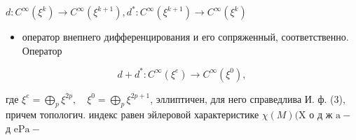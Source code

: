 \documentclass[10pt]{article}
\begin{document}
$d: C^{\infty}\left(\xi^{k}\right) \rightarrow C^{\infty}\left(\xi^{k+1}\right), d^{*}: C^{\infty}\left(\xi^{k+1}\right) \rightarrow C^{\infty}\left(\xi^{k}\right)$



\begin{itemize}

  \item оператор внепнего дифференцирования и его сопряженный, соответственно. Оператор

\end{itemize}



\[

d+d^{*}: C^{\infty}\left(\xi^{e}\right) \rightarrow C^{\infty}\left(\xi^{0}\right),

\]



где $\xi^{e}=\bigoplus_{p} \xi^{2 p}, \quad \xi^{0}=\bigoplus_{p} \xi^{2 p+1}$, эллиптичен, для него справедлива И. ф. (3), причем топологич. индекс равен эйлеровой характеристике $\chi(M)(\mathrm{X}$ о д ж $\mathrm{a}-$ д $\mathrm{e} \mathrm{P} \mathrm{a}-$
\end{document}

